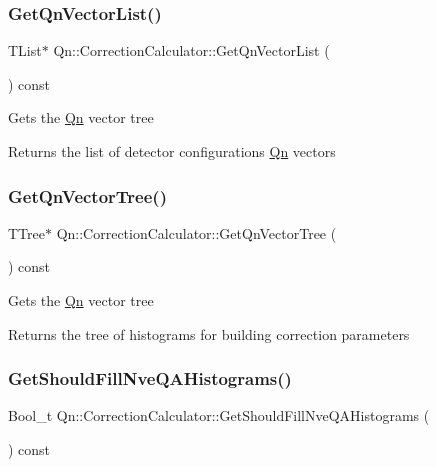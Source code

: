 \subsubsection{\texorpdfstring{Get\+Qn\+Vector\+List()}{GetQnVectorList()}}
{\footnotesize\ttfamily T\+List$\ast$ Qn\+::\+Correction\+Calculator\+::\+Get\+Qn\+Vector\+List (\begin{DoxyParamCaption}{ }\end{DoxyParamCaption}) const\hspace{0.3cm}{\ttfamily [inline]}}

Gets the \mbox{\hyperlink{namespaceQn}{Qn}} vector tree \begin{DoxyReturn}{Returns}
the list of detector configurations \mbox{\hyperlink{namespaceQn}{Qn}} vectors 
\end{DoxyReturn}
\mbox{\label{classQn_1_1CorrectionCalculator_adf1e27092d3097725f051716bf3205d8}} 
\subsubsection{\texorpdfstring{Get\+Qn\+Vector\+Tree()}{GetQnVectorTree()}}
{\footnotesize\ttfamily T\+Tree$\ast$ Qn\+::\+Correction\+Calculator\+::\+Get\+Qn\+Vector\+Tree (\begin{DoxyParamCaption}{ }\end{DoxyParamCaption}) const\hspace{0.3cm}{\ttfamily [inline]}}

Gets the \mbox{\hyperlink{namespaceQn}{Qn}} vector tree \begin{DoxyReturn}{Returns}
the tree of histograms for building correction parameters 
\end{DoxyReturn}
\mbox{\label{classQn_1_1CorrectionCalculator_aa36a55165d5992bf626705df5bc4c992}} 
\subsubsection{\texorpdfstring{Get\+Should\+Fill\+Nve\+Q\+A\+Histograms()}{GetShouldFillNveQAHistograms()}}
{\footnotesize\ttfamily Bool\+\_\+t Qn\+::\+Correction\+Calculator\+::\+Get\+Should\+Fill\+Nve\+Q\+A\+Histograms (\begin{DoxyParamCaption}{ }\end{DoxyParamCaption}) const\hspace{0.3cm}{\ttfamily [inline]}}

